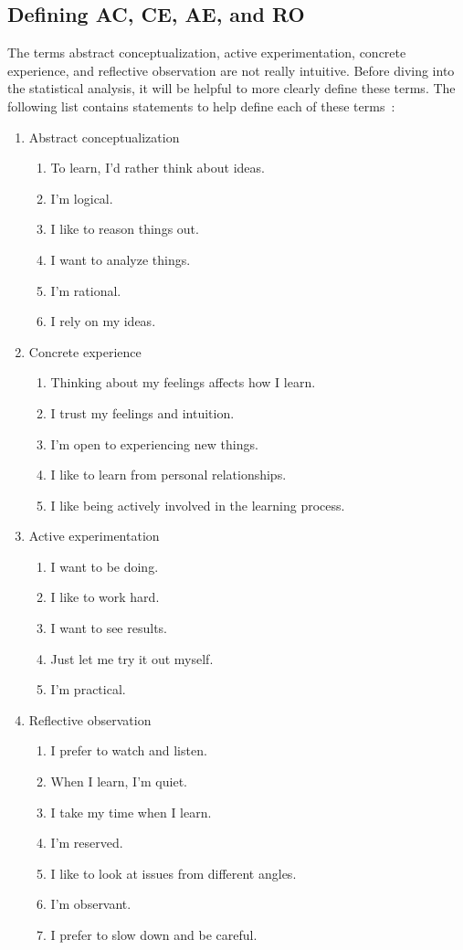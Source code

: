 \subsection{Defining AC, CE, AE, and RO}
The terms abstract conceptualization, active experimentation, concrete experience, and reflective observation are not really intuitive. Before diving into the statistical analysis, it will be helpful to more clearly define these terms. The following list contains statements to help define each of these terms~\citep{kolb1993}:
\begin{enumerate}
  \item Abstract conceptualization
  \begin{enumerate}
    \item To learn, I'd rather think about ideas.
    \item I'm logical.
    \item I like to reason things out.
    \item I want to analyze things.
    \item I'm rational.
    \item I rely on my ideas.
  \end{enumerate}
  \item Concrete experience
  \begin{enumerate}
    \item Thinking about my feelings affects how I learn.
    \item I trust my feelings and intuition.
    \item I'm open to experiencing new things.
    \item I like to learn from personal relationships.
    \item I like being actively involved in the learning process.
  \end{enumerate}
  \item Active experimentation
  \begin{enumerate}
    \item I want to be doing.
    \item I like to work hard.
    \item I want to see results.
    \item Just let me try it out myself.
    \item I'm practical.
  \end{enumerate}
  \item Reflective observation
  \begin{enumerate}
    \item I prefer to watch and listen.
    \item When I learn, I'm quiet.
    \item I take my time when I learn.
    \item I'm reserved.
    \item I like to look at issues from different angles.
    \item I'm observant.
    \item I prefer to slow down and be careful.
  \end{enumerate}
\end{enumerate}

